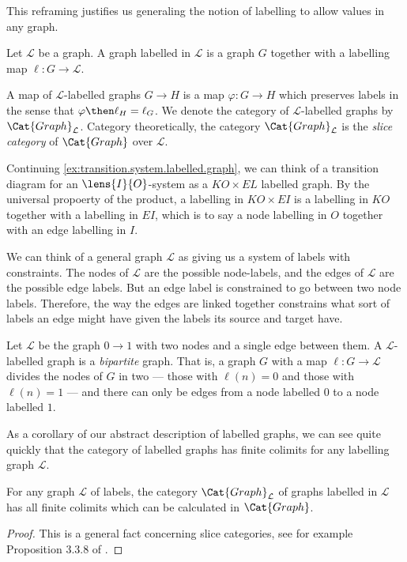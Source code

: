 \documentclass[DynamicalBook]{subfiles}
\begin{document}
This reframing justifies us generaling the notion of labelling to allow values in any graph.
  \begin{definition}
Let $\mathcal{L}$ be a graph. A graph labelled in $\mathcal{L}$ is a graph $G$ together with a labelling map $\ell : G \to \mathcal{L}$.

A map of $\mathcal{L}$-labelled graphs $G \to H$ is a map $\varphi : G \to H$ which preserves labels in the sense that $\varphi \then \ell_{H} = \ell_{G}$. We denote the category of $\mathcal{L}$-labelled graphs by $\Cat{Graph}_{\mathcal{L}}$. Category theoretically, the category $\Cat{Graph}_{\mathcal{L}}$ is the \emph{slice category} of $\Cat{Graph}$ over $\mathcal{L}$.
    \end{definition}

      \begin{example}
Continuing \cref{ex:transition.system.labelled.graph}, we can think of a transition diagram for an $\lens{I}{O}$-system as a $KO \times EL$ labelled graph. By the universal propoerty of the product, a labelling in $KO \times EI$ is a labelling in $KO$ together with a labelling in $EI$, which is to say a node labelling in $O$ together with an edge labelling in $I$.
        \end{example}

We can think of a general graph $\mathcal{L}$ as giving us a system of labels with constraints. The nodes of $\mathcal{L}$ are the possible node-labels, and the edges of $\mathcal{L}$ are the possible edge labels. But an edge label is constrained to go between two node labels. Therefore, the way the edges are linked together constrains what sort of labels an edge might have given the labels its source and target have.

    \begin{example}
Let $\mathcal{L}$ be the graph $0 \to 1$ with two nodes and a single edge between them. A $\mathcal{L}$-labelled graph is a \emph{bipartite} graph. That is, a graph $G$ with a map $\ell : G \to \mathcal{L}$ divides the nodes of $G$ in two --- those with $\ell(n) = 0$ and those with $\ell(n) = 1$ --- and there can only be edges from a node labelled $0$ to a node labelled $1$.
      \end{example}

As a corollary of our abstract description of labelled graphs, we can see quite quickly that the category of labelled graphs has finite colimits for any labelling graph $\mathcal{L}$.

\begin{proposition}\label{prop:colimits.labelled.graphs}
For any graph $\mathcal{L}$ of labels, the category $\Cat{Graph}_{\mathcal{L}}$ of graphs labelled in $\mathcal{L}$ has all finite colimits which can be calculated in $\Cat{Graph}$.
  \end{proposition}
  \begin{proof}
This is a general fact concerning slice categories, see for example Proposition 3.3.8 of \cite{Riehl:intro.to.cats}.
  \end{proof}
\end{document}
